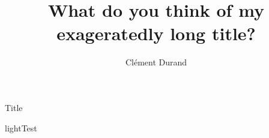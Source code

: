 \documentclass[aspectratio=43]{beamer}
\title[\hrulefill{}This will probably be a way too long subtitle, but is wanted, actually]
      {\hrulefill{}What do you think of my exageratedly long title?}
      [Wizzilab]
\author{Clément Durand}
\begin{document}
\maketitle

\begin{frame}{Title}
  \lipsum[1]
\end{frame}




\begin{picframe}[lightbw]{light}{Test}
\end{picframe}
\end{document}
